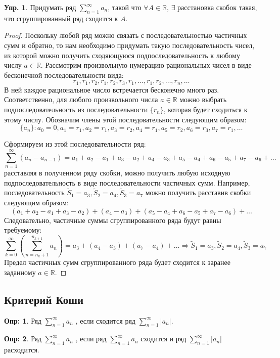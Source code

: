 \documentclass[12pt]{article}
\newcommand{\MR}{\mathbb{R}}
\theoremstyle{definition}
\newtheorem{defn}{Опр:}
\newtheorem{exrc}{Упр.}
\newcommand{\ssum}[1]{\displaystyle \sum\limits_{n=1}^{\infty}{#1}_n}
\begin{document}
\begin{exrc}
	Придумать ряд $\ssum{a}$, такой что $\forall A \in \MR ,\, \exists$ расстановка скобок такая, что сгруппированный ряд сходится к $A$.
\end{exrc}
\begin{proof}
	Поскольку любой ряд можно связать с последовательностью частичных сумм и обратно, то нам необходимо придумать такую последовательность чисел, из которой можно получить сходяющуюся подпоследовательность к любому числу $a \in \MR$. Рассмотрим произвольную нумерацию рациональных чисел в виде бесконечной последовательности вида:
	$$
		r_1, r_1, r_2, r_1, r_2, r_3, r_1, \dotsc, r_1, r_2, \dotsc, r_n, \dotsc 
	$$
	В ней каждое рациональное число встречается бесконечно много раз. Соответственно, для любого произвольного числа $a \in \MR$ можно выбрать подпоследовательность из последовательности $\{r_n\}$, которая будет сходиться к этому числу. Обозначим члены этой последовательности следующим образом:
	$$
		\{a_n\} \colon a_0 = 0, a_1 = r_1, a_2 = r_1, a_3 = r_2, a_4 = r_1, a_5 = r_2, a_6 = r_3, a_7 = r_1, \dotsc
	$$
	
	Сформируем из этой последовательности ряд:
	$$
		\sum\limits_{n = 1}^{\infty} (a_n - a_{n-1}) = a_1 + a_2 - a_1 + a_3 - a_2 + a_4 - a_3 + a_5 - a_4 + a_6 - a_5 + a_7 - a_6 + \dotsc
	$$
	расставляя в полученном ряду скобки, можно получить любую исходную подпоследовательность в виде последовательности частичных сумм. Например, последовательность $\widetilde{S}_1 = a_3, \widetilde{S}_2 = a_4, \widetilde{S}_3 = a_7$ можно получить расставив скобки следующим образом:
	$$
		(a_1 + a_2 - a_1 + a_3 - a_2) + (a_4 - a_3) + (a_5 - a_4 + a_6 - a_5 + a_7 - a_6) + \dotsc
	$$
	Следовательно, частичные суммы сгруппированного ряда будут равны требуемому:
	$$
		\sum\limits_{k = 0}^{\infty}\left(\sum\limits_{n = n_k+1}^{n_{k+1}}a_n\right) = a_3 + (a_4 - a_3) + (a_7 - a_4) + \dotsc \Rightarrow \widetilde{S}_1 = a_3, \widetilde{S}_2 = a_4, \widetilde{S}_3 = a_7
	$$
	Предел частичных сумм сгруппированного ряда будет сходится к заранее заданному $a \in \MR$. 
\end{proof}
\newpage
\subsection*{Критерий Коши}
\begin{defn}
	Ряд $\ssum{a}$ , если сходится ряд $\displaystyle \sum\limits_{n = 1}^{\infty} |a_n|$.
\end{defn}
\begin{defn}
	Ряд $\ssum{a}$ , если ряд $\ssum{a}$ сходится и ряд $\displaystyle \sum\limits_{n = 1}^{\infty} |a_n|$ расходится.
\end{defn}
\end{document}
